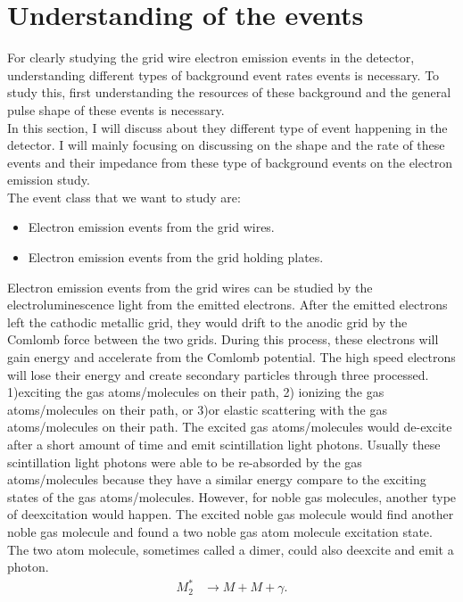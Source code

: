 \section{Understanding of the events}
For clearly studying the grid wire electron emission events in the detector, understanding different types of background event rates events is necessary. To study this, first understanding the resources of these background and the general pulse shape of these events is necessary.\\
In this section, I will discuss about they different type of event happening in the detector. I will mainly focusing on discussing on the shape and the rate of these events and their impedance from these type of background events on the electron emission study.\\
The event class that we want to study are:\\
\begin{itemize}
\item Electron emission events from the grid wires.           
\item Electron emission events from the grid holding plates.
\end{itemize}
Electron emission events from the grid wires can be studied by the electroluminescence light from the emitted electrons. After the emitted electrons left the cathodic metallic grid, they would drift to the anodic grid by the Comlomb force between the two grids. During this process, these electrons will gain energy and accelerate from the Comlomb potential. The high speed electrons will lose their energy and create secondary particles through three processed. 1)exciting the gas atoms/molecules on their path, 2) ionizing the gas atoms/molecules on their path, or 3)or elastic scattering with the gas atoms/molecules on their path. The excited gas atoms/molecules would de-excite after a short amount of time and emit scintillation light photons. Usually these scintillation light photons were able to be re-absorded by the gas atoms/molecules because they have a similar energy compare to the exciting states of the gas atoms/molecules. However, for noble gas molecules, another type of deexcitation would happen. The excited noble gas molecule would find another noble gas molecule and found a two noble gas atom molecule excitation state. The two atom molecule, sometimes called a dimer, could also deexcite and emit a photon.\\ 
\begin{align}
M_2^* &\rightarrow M + M + \gamma.
\end{align}
